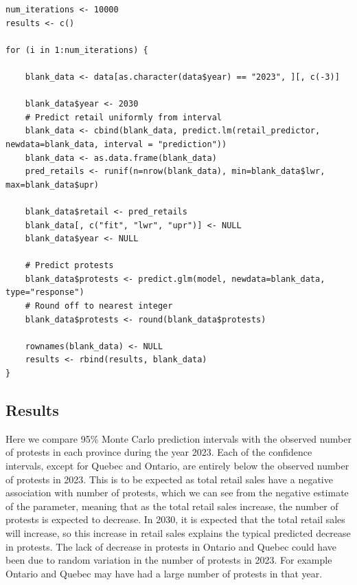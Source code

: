 \documentclass[12pt]{article}
\begin{document}
\begin{lstlisting}
num_iterations <- 10000
results <- c()

for (i in 1:num_iterations) {

	blank_data <- data[as.character(data$year) == "2023", ][, c(-3)]

	blank_data$year <- 2030
	# Predict retail uniformly from interval
	blank_data <- cbind(blank_data, predict.lm(retail_predictor, newdata=blank_data, interval = "prediction"))
	blank_data <- as.data.frame(blank_data)
	pred_retails <- runif(n=nrow(blank_data), min=blank_data$lwr, max=blank_data$upr)
	
	blank_data$retail <- pred_retails
	blank_data[, c("fit", "lwr", "upr")] <- NULL
	blank_data$year <- NULL
	
	# Predict protests
	blank_data$protests <- predict.glm(model, newdata=blank_data, type="response")
	# Round off to nearest integer
	blank_data$protests <- round(blank_data$protests)

	rownames(blank_data) <- NULL
	results <- rbind(results, blank_data)
}
\end{lstlisting}

\subsection*{Results}
Here we compare 95\% Monte Carlo prediction intervals with the observed number of protests in each province during the year 2023. Each of the confidence intervals, except for Quebec and Ontario, are entirely below the observed number of protests in 2023. This is to be expected as total retail sales have a negative association with number of protests, which we can see from the negative estimate of the parameter, meaning that as the total retail sales increase, the number of protests is expected to decrease. In 2030, it is expected that the total retail sales will increase, so this increase in retail sales explains the typical predicted decrease in protests. The lack of decrease in protests in Ontario and Quebec could have been due to random variation in the number of protests in 2023. For example Ontario and Quebec may have had a large number of protests in that year.
\end{document}
